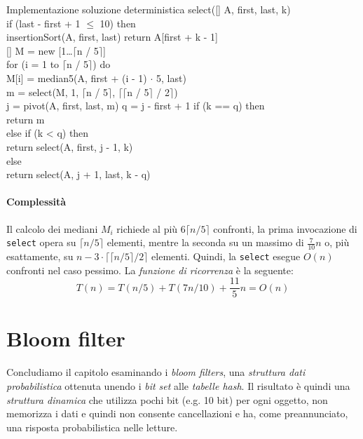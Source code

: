 \newpage
\begin{minicode}{Implementazione soluzione deterministica}
\ind{} select([] A,  first,  last,  k)\\
    \indf if (last - first + 1 $\leq$ 10) then\\
        insertionSort(A, first, last)\hfill{}
        return A[first + k - 1]\\
    \indf{}
    \indf{}[] M = new [1\dots$\lceil$n / 5$\rceil$]\\
    \indf for (i = 1 to $\lceil$n / 5$\rceil$) do\\
        M[i] = median5(A, first + (i - 1) $\cdot$ 5, last)\\
    \indf{}
    \indf{} m = select(M, 1, $\lceil$n / 5$\rceil$, $\lceil\lceil$n / 5$\rceil$ / 2$\rceil$)\\
    \indf{} j = pivot(A, first, last, m)\hfill{}
    \indf{} q = j - first + 1\hfill{}
    \indf if (k == q) then\\
        return m\\
    \indf else if (k < q) then\\
        return select(A, first, j - 1, k)\\
    \indf else\\
        return select(A, j + 1, last, k - q)
\end{minicode}

\paragraph{Complessità}
Il calcolo dei mediani $M_i$ richiede al più $6\lceil n/5\rceil$ confronti, la
prima invocazione di \texttt{select} opera su $\lceil n/5\rceil$ elementi, mentre
la seconda su un massimo di $\frac{7}{10}n$ o, più esattamente, su $n-3\cdot\lceil
\lceil n/5\rceil/2\rceil$ elementi. Quindi, la \texttt{select} esegue $O(n)$
confronti nel caso pessimo. La \emph{funzione di ricorrenza} è la seguente:
\[T(n)=T(n/5)+T(7n/10)+\frac{11}{5}n=O(n)\]

\section{Bloom filter}
Concludiamo il capitolo esaminando i \emph{bloom filters}, una \emph{struttura
dati probabilistica} ottenuta unendo i \emph{bit set} alle \emph{tabelle hash}. Il
risultato è quindi una \emph{struttura dinamica} che utilizza pochi bit (e.g. 10
bit) per ogni oggetto, non memorizza i dati e quindi non consente cancellazioni e
ha, come preannunciato, una risposta probabilistica nelle letture.

